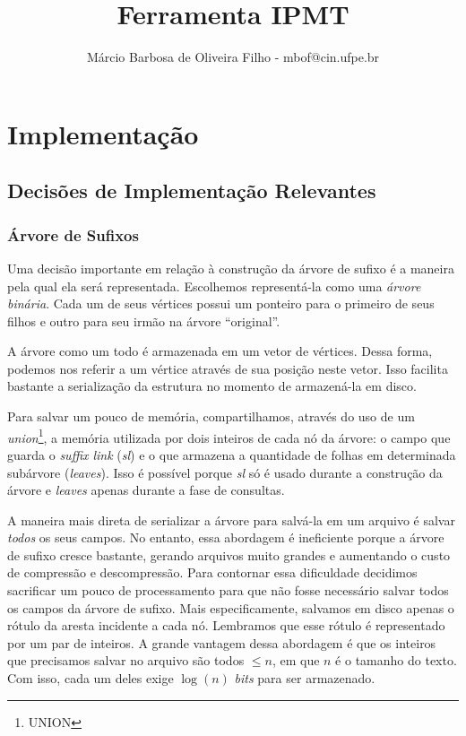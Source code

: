 \documentclass[]{article}
\title{Ferramenta IPMT}
\author{Márcio Barbosa de Oliveira Filho - mbof@cin.ufpe.br}
\date{}
\begin{document}
\maketitle

\section{Implementação}

\subsection{Decisões de Implementação Relevantes}

\subsubsection{Árvore de Sufixos}

Uma decisão importante em relação à construção da árvore de sufixo é a maneira pela qual ela será representada. Escolhemos representá-la como uma \textit{árvore binária}. Cada um de seus vértices possui um ponteiro para o primeiro de seus filhos e outro para seu irmão na árvore ``original''. 

A árvore como um todo é armazenada em um vetor de vértices. Dessa forma, podemos nos referir a um vértice através de sua posição neste vetor. Isso facilita bastante a serialização da estrutura no momento de armazená-la em disco. 

Para salvar um pouco de memória, compartilhamos, através do uso de um \textit{union}\footnote{UNION}, a memória utilizada por dois inteiros de cada nó da árvore: o campo que guarda o \textit{suffix link} (\textit{sl}) e o que armazena a quantidade de folhas em determinada subárvore (\textit{leaves}). Isso é possível porque \textit{sl} só é usado durante a construção da árvore e \textit{leaves} apenas durante a fase de consultas.

A maneira mais direta de serializar a árvore para salvá-la em um arquivo é salvar \textit{todos} os seus campos. No entanto, essa abordagem é ineficiente porque a árvore de sufixo cresce bastante, gerando arquivos muito grandes e aumentando o custo de compressão e descompressão. Para contornar essa dificuldade decidimos sacrificar um pouco de processamento para que não fosse necessário salvar todos os campos da árvore de sufixo. Mais especificamente, salvamos em disco apenas o rótulo da aresta incidente a cada nó. Lembramos que esse rótulo é representado por um par de inteiros. A grande vantagem dessa abordagem é que os inteiros que precisamos salvar no arquivo são todos $\leq n$, em que $n$ é o tamanho do texto. Com isso, cada um deles exige $\log(n)$ \textit{bits} para ser armazenado.
\end{document}
